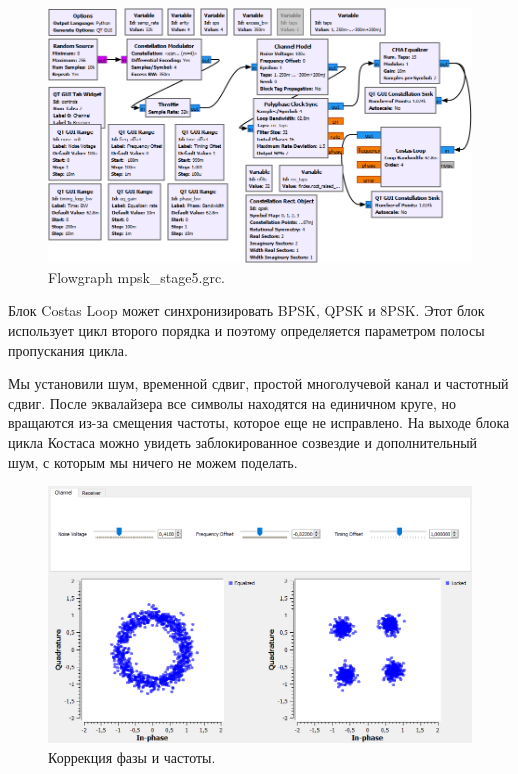 \documentclass[a4paper, 14pt]{extarticle}
\begin{document}
    \begin{figure}[h]
        \centering
        \includegraphics[width=0.9\linewidth]{resources/Images/task6_mpsk_stage5}
        \caption{Flowgraph mpsk\_stage5.grc.}
        \label{fig:task6_mpsk_stage5}
    \end{figure}

    Блок Costas Loop может синхронизировать BPSK, QPSK и 8PSK.
    Этот блок использует цикл второго порядка и поэтому определяется параметром полосы пропускания цикла.

    Мы установили шум, временной сдвиг, простой многолучевой канал и частотный сдвиг.
    После эквалайзера все символы находятся на единичном круге, но вращаются из-за смещения частоты,
    которое еще не исправлено.
    На выходе блока цикла Костаса можно увидеть заблокированное созвездие и дополнительный шум,
    с которым мы ничего не можем поделать.

    \begin{figure}[H]
        \centering
        \includegraphics[width=0.9\linewidth]{resources/Images/task6_phase_freq_corr}
        \caption{Коррекция фазы и частоты.}
        \label{fig:task6_phase_freq_corr}
    \end{figure}
\end{document}
